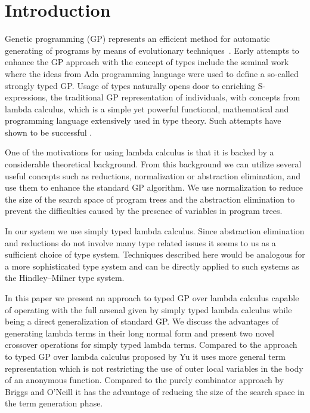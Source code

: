 \documentclass{sig-alternate}
\begin{document}


\section{Introduction}


Genetic programming (GP) represents an efficient method for automatic generating of programs by means of evolutionary techniques~\cite{koza92,koza03}. Early attempts to enhance the GP approach with the concept of types include the seminal work~\cite{montana95} where the ideas from Ada programming language were used to define a so-called strongly typed GP.   
Usage of types naturally opens door to enriching S-expressions,
the traditional GP representation of individuals, with concepts from
lambda calculus, which is a simple yet powerful functional, mathematical and programming language extensively used in type theory. Such attempts have shown to be successful \cite{yu01}. 

One of the motivations for using lambda calculus is that it is backed by a considerable theoretical background. From this background we can utilize several useful concepts such as reductions, normalization or abstraction elimination, and use them to enhance the standard GP algorithm. We use normalization to reduce the size of the search space of program trees and the abstraction elimination to prevent
the difficulties caused by the presence of variables in program trees.

In our system we use simply typed lambda calculus. Since abstraction elimination and reductions do not involve many type related issues it seems to us as a sufficient choice of type system. Techniques described here would be analogous for a more sophisticated type system and can be directly applied to such systems as the Hindley–Milner type system.


In this paper we present an approach to typed GP over lambda calculus capable of operating with the full arsenal given by simply typed lambda calculus while being a direct generalization of standard GP\cite{koza92}. We discuss the advantages of generating lambda terms in their long normal form and present two novel crossover operations for simply typed lambda terms. Compared to the approach to typed GP over lambda calculus  proposed by Yu\cite{yu01} it uses more general term representation which is not restricting the use of outer local variables in the body of an anonymous function. Compared to the purely combinator approach by Briggs and O’Neill\cite{kes} it has the advantage of reducing the size of the search space in the term generation phase.
\end{document}
